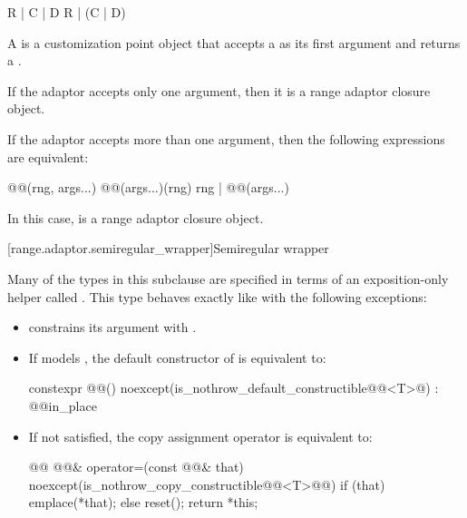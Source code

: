 {\begin{codeblock}
R | C | D
R | (C | D)
\end{codeblock}

\pnum
A  is a
customization point object
that accepts a  as its first argument and returns a
.

\pnum
If the adaptor accepts only one argument, then it is a range adaptor closure
object.

\pnum
If the adaptor accepts more than one argument, then the following expressions
are equivalent:

\begin{codeblock}
@@(rng, args...)
@@(args...)(rng)
rng | @@(args...)
\end{codeblock}

In this case,  is a  range adaptor
closure object.

[range.adaptor.semiregular_wrapper]{Semiregular wrapper}

\pnum
Many of the types in this subclause are specified in terms of an exposition-only
helper called . This type behaves exactly
like  with the following exceptions:

\begin{itemize}
\item {} constrains its argument
with .

\item If  models , the default
constructor of  is equivalent to:
\begin{codeblock}
constexpr @@()
  noexcept(is_nothrow_default_constructible@@<T>@)
  : @@{in_place}
{ }
\end{codeblock}

\item If 
   not
satisfied, the copy assignment operator is equivalent to:
\begin{codeblock}
@@ @@& operator=(const @@& that)
  noexcept(is_nothrow_copy_constructible@@<T>@@)
{
  if (that) emplace(*that);
  else reset();
  return *this;
}
\end{codeblock}


\end{itemize}}
